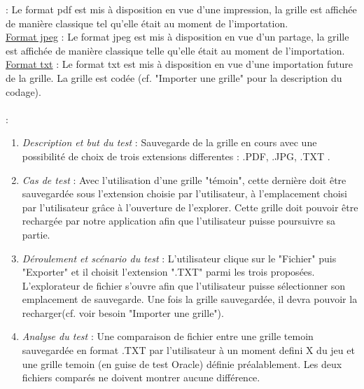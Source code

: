 \documentclass [ 11 pt ] {article}
\begin{document}
 : Le format pdf est mis à disposition en vue d'une impression, la grille est affichée de manière classique tel qu'elle était au moment de l'importation.\\
\underline {Format jpeg} : Le format jpeg est mis à disposition en vue d'un partage, la grille est affichée de manière classique telle qu'elle était au moment de l'importation.\\
\underline {Format txt} : Le format txt est mis à disposition en vue d'une importation future de la grille. La grille est codée (cf. "Importer une grille" pour la description du codage). \\ \\
 :
 \begin{tcolorbox}[colback=positifC]
            \begin{enumerate}
                \item \textit{Description et but du test} : Sauvegarde de la grille en cours avec une possibilité de choix de trois extensions differentes : .PDF, .JPG, .TXT .\newline
                
                \item \textit{Cas de test} : Avec l'utilisation d'une grille "témoin", cette dernière doit être sauvegardée sous l'extension choisie par l'utilisateur, à l'emplacement choisi par l'utilisateur grâce à l'ouverture de l'explorer. Cette grille doit pouvoir être rechargée par notre application afin que l'utilisateur puisse poursuivre sa partie. \newline
                
                \item \textit{Déroulement et scénario du test} : L'utilisateur clique sur le "Fichier" puis "Exporter" et il choisit l'extension ".TXT" parmi les trois proposées. L'explorateur de fichier s'ouvre afin que l'utilisateur puisse sélectionner son emplacement de sauvegarde. Une fois la grille sauvegardée, il devra pouvoir la recharger(cf. voir besoin "Importer une grille"). \newline
                
                \item \textit{Analyse du test} : Une comparaison de fichier entre une grille temoin sauvegardée en format .TXT par l'utilisateur à un moment defini X du jeu et une grille temoin (en guise de test Oracle) définie préalablement. Les deux fichiers comparés ne doivent montrer aucune différence.
            \end{enumerate}
        \end{tcolorbox}
\end{document}
